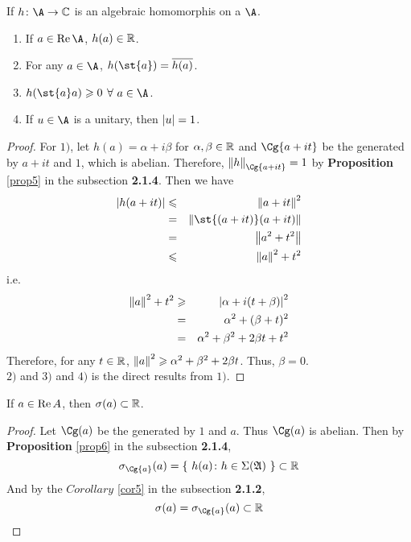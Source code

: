 \begin{prop}
	If $h \colon \A \sto \C$ is an algebraic homomorphis on a \Cs $\A$. 
	\begin{enumerate}[label=\arabic*)]
		\item If $a \in \Rea{\A}$, $h(a) \in \mathbb{R}$.
		\item For any $a \in \A$, $h(\st{a})=\clo{h(a)}$.
		\item $h(\st{a}a) \geqslant 0$ $\forall~ a \in \A$.
		\item If $u \in \A$ is a unitary, then $\left\lvert u\right\lvert = 1$.
	\end{enumerate}
\end{prop}
\begin{proof}
	For $1)$, let $h(a) = \alpha +i \beta$ for $\alpha,\beta \in \mathbb{R}$ and $\Cg{a+it}$ be the \Cs generated by $a+it$ and $1$, which is abelian. Therefore, $\norm{h}_{\Cg{a+it}} = 1$ by \textbf{Proposition} \ref{prop5} in the subsection \textbf{2.1.4}. Then we have
	\begin{eqnarray*}
		\abs{h(a+it)} &\leqslant& \norm{a+it}^{2} \\
		&=& \norm{\st{(a+it)}(a+it)} \\
		&=& \norm{a^{2}+t^{2}} \\
		&\leqslant& \norm{a}^{2}+t^2
	\end{eqnarray*}
	i.e.
	\begin{eqnarray*}
		\left\lVert a\right\lVert^{2}+t^2 &\geqslant& \left\lvert\alpha +i(t+\beta)\right\lvert^2 \\
		&=& \alpha^2 + (\beta+t)^2 \\
		&=& \alpha^2 + \beta^2 +2 \beta t + t^2
	\end{eqnarray*}
	Therefore, for any $t \in \mathbb{R}$, $\left\lVert a\right\lVert^2 \geqslant \alpha^2 + \beta^2 +2 \beta t$. Thus, $\beta = 0$. \\
	$2)$ and $3)$ and $4)$ is the direct results from $1)$.
\end{proof}

\begin{cor}
	If $a \in \operatorname{Re}{A}$, then $\sigma(a) \subset \mathbb{R}$.
\end{cor}
\begin{proof}
	Let $\Cg(a)$ be the \Cs generated by $1$ and $a$. Thus $\Cg(a)$ is abelian. Then by \textbf{Proposition} \ref{prop6} in the subsection \textbf{2.1.4}, 
	\begin{equation*}
		\sigma_{\Cg{a}}(a) = \{~ h(a) \colon h \in \Sigma(\alg{A}) ~\} \subset \R
	\end{equation*} 
	And by the $Corollary$ \ref{cor5} in the subsection \textbf{2.1.2},
	\begin{equation*}
		\sigma(a) = \sigma_{\Cg{a}}(a) \subset \R
	\end{equation*}
\end{proof}

